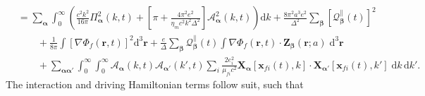 \documentclass{article}
\begin{document}
\begin{equation}
\begin{split}
&= \sum_{\bm{\alpha}}\int_0^\infty\left(\frac{c^2k^2}{16\pi}\mathit{\Pi}_{\bm{\alpha}}^2(k,t) + \left[\pi + \frac{4\pi^2e^2}{\eta_mc^2k^2\Delta^2}\right]\mathcal{A}_{\bm{\alpha}}^2(k,t)\right)\mathrm{d}k + \frac{8\pi^2a^3e^2}{\Delta^2}\sum_{\bm{\beta}}\left[\mathcal{Q}_{\bm{\beta}}^\parallel(t)\right]^2\\
&\qquad + \frac{1}{8\pi}\int\left[\nabla\Phi_f(\mathbf{r},t)\right]^2\mathrm{d}^3\mathbf{r} + \frac{e}{\Delta}\sum_{\bm{\beta}}\mathcal{Q}_{\bm{\beta}}^\parallel(t)\int\nabla\Phi_f(\mathbf{r},t)\cdot\mathbf{Z}_{\bm{\beta}}(\mathbf{r};a)\;\mathrm{d}^3\mathbf{r}\\
&\qquad + \sum_{\bm{\alpha}\bm{\alpha}'}\int_0^\infty\int_0^\infty\mathcal{A}_{\bm{\alpha}}(k,t)\mathcal{A}_{\bm{\alpha}'}(k',t)\sum_i\frac{2e_i^2}{\mu_{fi}c^2}\mathbf{X}_{\bm{\alpha}}[\mathbf{x}_{fi}(t),k]\cdot\mathbf{X}_{\bm{\alpha}'}[\mathbf{x}_{fi}(t),k']\;\mathrm{d}k\,\mathrm{d}k'.
\end{split}
\end{equation}
The interaction and driving Hamiltonian terms follow suit, such that
\end{document}
